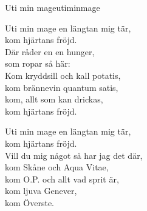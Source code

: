 \begin{song}{Uti min mage}{utiminmage}
\begin{vers}
Uti min mage en längtan mig tär,\\
kom hjärtans fröjd.\\
Där råder en en hunger,\\
som ropar så här:\\
Kom kryddsill och kall potatis,\\
kom brännevin quantum satis,\\
kom, allt som kan drickas,\\
kom hjärtans fröjd.\\
\end{vers}
\begin{vers}
Uti min mage en längtan mig tär,\\
kom hjärtans fröjd.\\
Vill du mig något så har jag det där,\\
kom Skåne och Aqua Vitae,\\
kom O.P. och allt vad sprit är,\\
kom ljuva Genever,\\
kom Överste.\\
\end{vers}
\end{song}
